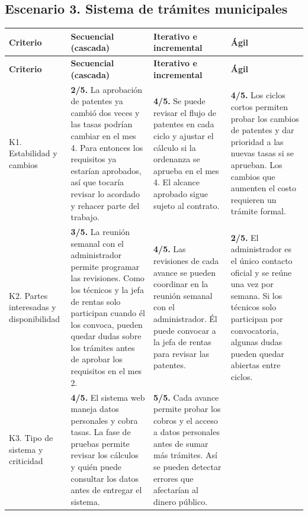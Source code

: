 \documentclass[11pt,a4paper]{article}
\begin{document}
	\clearpage
	\subsection{Escenario 3. Sistema de trámites municipales}

	\begin{longtable}{|p{2.6cm}|*{3}{>{\raggedright\arraybackslash}p{\dimexpr(\textwidth-2.6cm-8\tabcolsep-5\arrayrulewidth)/3\relax}|}}
		\hline
		\textbf{Criterio} &
		\textbf{Secuencial (cascada)} &
		\textbf{Iterativo e incremental} &
		\textbf{Ágil} \\ \hline
		\endfirsthead
		\hline
		\textbf{Criterio} &
		\textbf{Secuencial (cascada)} &
		\textbf{Iterativo e incremental} &
		\textbf{Ágil} \\ \hline
		\endhead
		K1. Estabilidad y cambios &
		\textbf{2/5.} La aprobación de patentes ya cambió dos veces y las tasas podrían
		cambiar en el mes 4. Para entonces los requisitos ya estarían aprobados, así que
		tocaría revisar lo acordado y rehacer parte del trabajo. &
		\textbf{4/5.} Se puede revisar el flujo de patentes en cada ciclo y ajustar
		el cálculo si la ordenanza se aprueba en el mes 4. El alcance aprobado
		sigue sujeto al contrato. &
		\textbf{4/5.} Los ciclos cortos permiten probar los cambios de patentes
		y dar prioridad a las nuevas tasas si se aprueban. Los cambios que
		aumenten el costo requieren un trámite formal. \\ \hline
		K2. Partes interesadas y disponibilidad &
		\textbf{3/5.} La reunión semanal con el administrador permite programar las
		revisiones. Como los técnicos y la jefa de rentas solo participan cuando él los
		convoca, pueden quedar dudas sobre los trámites antes de aprobar los requisitos
		en el mes 2. &
		\textbf{4/5.} Las revisiones de cada avance se pueden coordinar en la
		reunión semanal con el administrador. Él puede convocar a la jefa
		de rentas para revisar las patentes. &
		\textbf{2/5.} El administrador es el único contacto oficial y se reúne
		una vez por semana. Si los técnicos solo participan por convocatoria,
		algunas dudas pueden quedar abiertas entre ciclos. \\ \hline
		K3. Tipo de sistema y criticidad &
		\textbf{4/5.} El sistema web maneja datos personales y cobra tasas. La fase de
		pruebas permite revisar los cálculos y quién puede consultar los datos antes de
		entregar el sistema. &
		\textbf{5/5.} Cada avance permite probar los cobros y el acceso a datos
		personales antes de sumar más trámites. Así se pueden detectar errores
		que afectarían al dinero público. &

\end{longtable}
\end{document}
